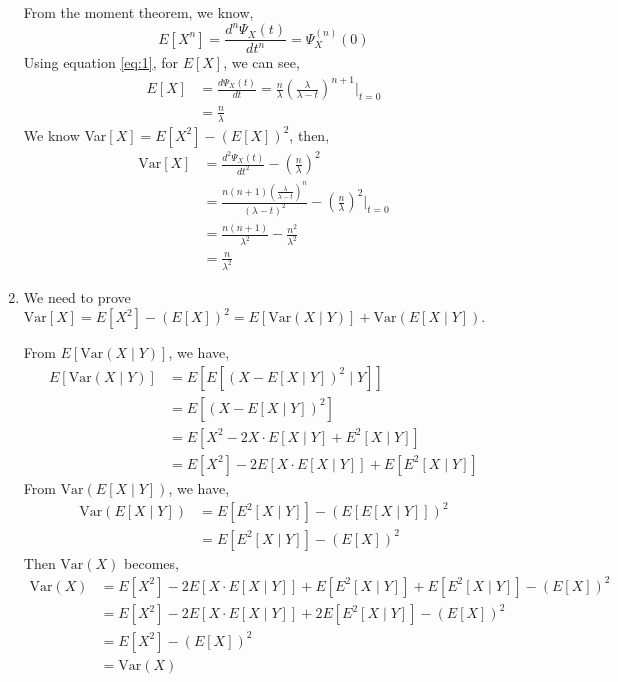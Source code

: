 \documentclass{article}
\begin{document}
\begin{enumerate}
				From the moment theorem, we know,
				\begin{equation}
					E[X^n] = \frac{d^n\Psi_{X}(t)}{dt^n} = \Psi_{X}^{(n)}(0)
					\label{eq:1}
				\end{equation}
				Using equation \ref{eq:1}, for $E[X]$, we can see,
				\begin{align*}
					E[X] &= \frac{d\Psi_{X}(t)}{dt} = \frac{n}{\lambda}\left(\frac{\lambda}{\lambda-t}\right)^{n+1} \bigg|_{t=0} \\
					&= \frac{n}{\lambda}
				\end{align*}
				We know Var$[X] = E[X^2] - \left(E[X]\right)^2$, then,
				\begin{align*}
					\mathrm{Var}[X] &= \frac{d^2\Psi_{X}(t)}{dt^2} - \left(\frac{n}{\lambda}\right)^2 \\
					&= \frac{n(n+1)\left(\frac{\lambda}{\lambda-t}\right)^n}{\left(\lambda-t\right)^2} - \left(\frac{n}{\lambda}\right)^2 \bigg|_{t=0} \\
					&= \frac{n(n+1)}{\lambda^2} - \frac{n^2}{\lambda^2} \\
					&= \frac{n}{\lambda^2}
				\end{align*}
			\item We need to prove $\mathrm{Var}[X] = E[X^2] - (E[X])^2 = E[\mathrm{Var}(X \mid Y)] + \mathrm{Var}(E[X \mid Y])$.

				From $E[\mathrm{Var}(X \mid Y)]$, we have,
				\begin{align*}
					E[\mathrm{Var}(X \mid Y)] &= E[E[(X - E[X \mid Y])^2 \mid Y]] \\
					&= E[(X - E[X \mid Y])^2] \\
					&= E[X^2 -2X \cdot E[X \mid Y] + E^2[X \mid Y]] \\
					&= E[X^2] - 2E[X \cdot E[X \mid Y]] + E[E^2[X \mid Y]]
				\end{align*}
				From $\mathrm{Var}(E[X \mid Y])$, we have,
				\begin{align*}
					\mathrm{Var}(E[X \mid Y]) &= E[E^2[X \mid Y]] - (E[E[X \mid Y]])^2 \\
					&= E[E^2[X \mid Y]] - (E[X])^2
				\end{align*}
				Then $\mathrm{Var}(X)$ becomes,
				\begin{align*}
					\mathrm{Var}(X) &= E[X^2] - 2E[X \cdot E[X \mid Y]] + E[E^2[X \mid Y]] + E[E^2[X \mid Y]] - (E[X])^2 \\
					&= E[X^2] - 2E[X \cdot E[X \mid Y]] + 2E[E^2[X \mid Y]] - (E[X])^2 \\
					&= E[X^2] - (E[X])^2 \\
					&= \mathrm{Var}(X)
				\end{align*}
		\end{enumerate}
\end{document}
